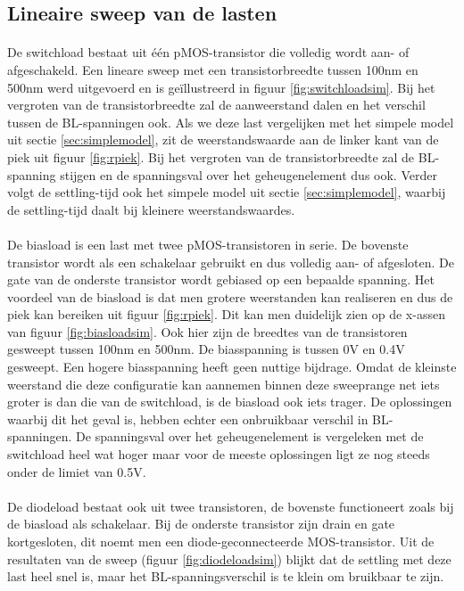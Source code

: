 \subsection{Lineaire sweep van de lasten}\label{sec:linload}
\paragraph{}
De switchload bestaat uit \'{e}\'{e}n pMOS-transistor die volledig wordt aan- of afgeschakeld. Een lineare sweep met een transistorbreedte tussen 100nm en 500nm werd uitgevoerd en is geïllustreerd in figuur \ref{fig:switchloadsim}. Bij het vergroten van de transistorbreedte zal de aanweerstand dalen en het verschil tussen de BL-spanningen ook. Als we deze last vergelijken met het simpele model uit sectie \ref{sec:simplemodel}, zit de weerstandswaarde aan de linker kant van de piek uit figuur \ref{fig:rpiek}. Bij het vergroten van de transistorbreedte zal de BL-spanning stijgen en de spanningsval over het geheugenelement dus ook. Verder volgt de settling-tijd ook het simpele model uit sectie \ref{sec:simplemodel}, waarbij de settling-tijd daalt bij kleinere weerstandswaardes.

\paragraph{}
De biasload is een last met twee pMOS-transistoren in serie. De bovenste transistor wordt als een schakelaar gebruikt en dus volledig aan- of afgesloten. De gate van de onderste transistor wordt gebiased op een bepaalde spanning. Het voordeel van de biasload is dat men grotere weerstanden kan realiseren en dus de piek kan bereiken uit figuur \ref{fig:rpiek}. Dit kan men duidelijk zien op de x-assen van figuur \ref{fig:biasloadsim}. Ook hier zijn de breedtes van de transistoren gesweept tussen 100nm en 500nm. De biasspanning is tussen 0V en 0.4V gesweept. Een hogere biasspanning heeft geen nuttige bijdrage. Omdat de kleinste weerstand die deze configuratie kan aannemen binnen deze sweeprange net iets groter is dan die van de switchload, is de biasload ook iets trager. De oplossingen waarbij dit het geval is, hebben echter een onbruikbaar verschil in BL-spanningen. De spanningsval over het geheugenelement is vergeleken met de switchload heel wat hoger maar voor de meeste oplossingen ligt ze nog steeds onder de limiet van 0.5V.

\paragraph{}
De diodeload bestaat ook uit twee transistoren, de bovenste functioneert zoals bij de biasload als schakelaar. Bij de onderste transistor zijn drain en gate kortgesloten, dit noemt men een diode-geconnecteerde MOS-transistor. Uit de resultaten van de sweep (figuur \ref{fig:diodeloadsim}) blijkt dat de settling met deze last heel snel is, maar het BL-spanningsverschil is te klein om bruikbaar te zijn.

